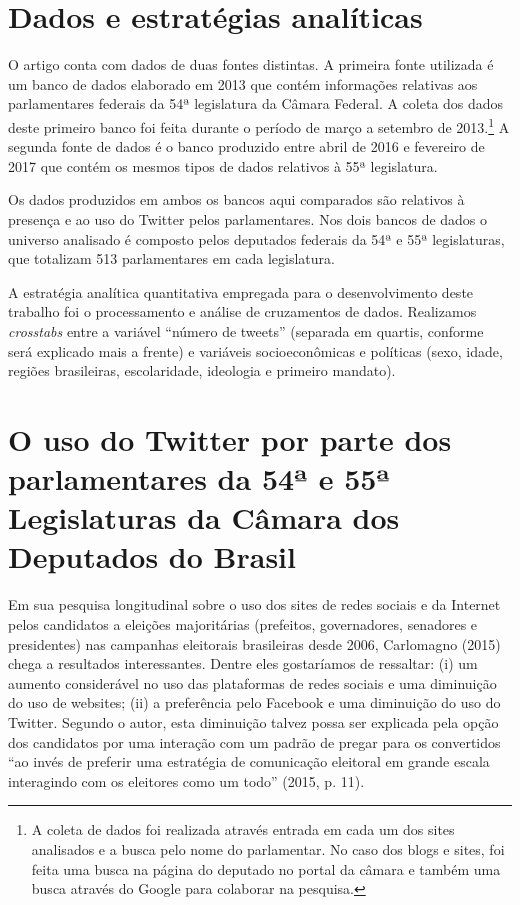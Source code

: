 \section{Dados e estratégias analíticas}

\noindent{}O artigo conta com dados de duas fontes distintas. A primeira fonte
utilizada é um banco de dados elaborado em 2013 que contém informações
relativas aos parlamentares federais da 54ª legislatura da Câmara
Federal. A coleta dos dados deste primeiro banco foi feita durante o
período de março a setembro de 2013.\footnote{A coleta de dados foi
  realizada através entrada em cada um dos sites analisados e a busca
  pelo nome do parlamentar. No caso dos blogs e sites, foi feita uma
  busca na página do deputado no portal da câmara e também uma busca
  através do Google para colaborar na pesquisa.} A segunda fonte de
dados é o banco produzido entre abril de 2016 e fevereiro de 2017 que
contém os mesmos tipos de dados relativos à 55ª legislatura.

Os dados produzidos em ambos os bancos aqui comparados são relativos à
presença e ao uso do Twitter pelos parlamentares. Nos dois bancos de
dados o universo analisado é composto pelos deputados federais da 54ª e
55ª legislaturas, que totalizam 513 parlamentares em cada legislatura.

A estratégia analítica quantitativa empregada para o desenvolvimento
deste trabalho foi o processamento e análise de cruzamentos de dados.
Realizamos \emph{crosstabs} entre a variável ``número de tweets''
(separada em quartis, conforme será explicado mais a frente) e variáveis
socioeconômicas e políticas (sexo, idade, regiões brasileiras,
escolaridade, ideologia e primeiro mandato).

\section{O uso do Twitter por parte dos parlamentares da 54ª e 55ª
Legislaturas da Câmara dos Deputados do Brasil}

\noindent{}Em sua pesquisa longitudinal sobre o uso dos sites de redes sociais e da
Internet pelos candidatos a eleições majoritárias (prefeitos,
governadores, senadores e presidentes) nas campanhas eleitorais
brasileiras desde 2006, Carlomagno (2015) chega a resultados
interessantes. Dentre eles gostaríamos de ressaltar: (i) um aumento
considerável no uso das plataformas de redes sociais e uma diminuição do
uso de websites; (ii) a preferência pelo Facebook e uma diminuição do
uso do Twitter. Segundo o autor, esta diminuição talvez possa ser
explicada pela opção dos candidatos por uma interação com um padrão de
pregar para os convertidos ``ao invés de preferir uma estratégia de
comunicação eleitoral em grande escala interagindo com os eleitores como
um todo'' (2015, p. 11).

